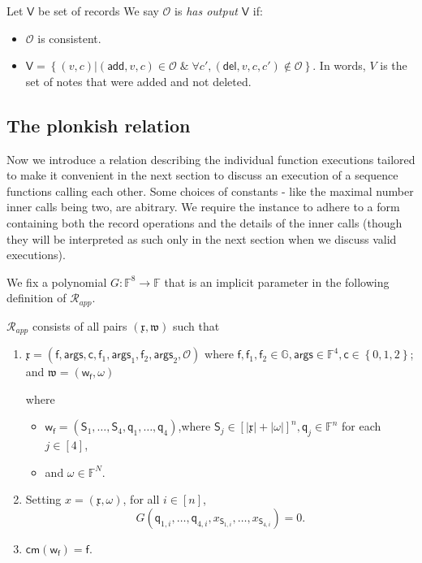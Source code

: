 \documentclass[11pt]{article} %
\newcommand{\G}{\ensuremath{{\mathbb G}}\xspace}
\newcommand{\F}{\ensuremath{\mathbb F}\xspace}
\newcommand{\cm}{\ensuremath{\mathsf{cm}}\xspace}
\newcommand{\wit}{\ensuremath{\omega}\xspace}
\newcommand{\rel}{\ensuremath{\mathcal{R}}\xspace}
\newcommand{\set}[1]{\ensuremath{\left\{#1\right\}}\xspace}
\newcommand{\perm}{\mathsf{S}}
\newcommand{\f}{\ensuremath{\mathsf{f}}\xspace}
\newcommand{\relapp}{\ensuremath{\rel_{app}}\xspace}
\newcommand{\add}{\ensuremath{\mathsf{add}}\xspace}
\newcommand{\del}{\ensuremath{\mathsf{del}}\xspace}
\newcommand{\ops}{\ensuremath{\mathcal{O}}\xspace}
\newcommand{\instapp}{\ensuremath{\mathfrak{x}}\xspace}
\newcommand{\witapp}{\ensuremath{\mathfrak{w}}\xspace}
\newcommand{\witf}{\ensuremath{\mathsf{w_f}}\xspace}
\newcommand{\sel}{\ensuremath{\mathsf{q}}\xspace}
\newcommand{\args}{\ensuremath{\mathsf{args}}\xspace}
\newcommand{\callnum}{\ensuremath{\mathsf{c}}\xspace}
\newcommand{\recset}{\ensuremath{\mathsf{V}}\xspace}
\begin{document}
Let \recset be set of records 
We say $\ops$ is \emph{has output \recset} if:
\begin{itemize}
 \item $\ops$ is consistent.
 \item $\recset=\set{(v,c) | (\add,v,c)\in \ops\;\&\; \forall c',(\del,v,c,c')\notin \ops }$. In words,
 $V$ is the set of notes that were added and not deleted.
\end{itemize}



\subsection{The plonkish relation}
Now we introduce a relation describing the individual function executions tailored to make it convenient in the next section to discuss an execution of a  sequence functions calling each other.
Some choices of constants - like the maximal number inner calls being two, are abitrary.
We require the instance to adhere to a form containing both the record operations and the details of the inner calls (though they will be interpreted as such only in the next section when we discuss valid executions).

We fix a polynomial $G:\F^8\to \F$ that is an implicit parameter in the following definition of \relapp.

\relapp consists of all pairs $(\instapp, \witapp)$ such that
\begin{enumerate}
 \item 

$\instapp= (\f,\args,\callnum, \f_1,\args_1, \f_2,\args_2,\ops)$
where $\f,\f_1,\f_2 \in \G,\args\in \F^4,\callnum\in \set{0,1,2}$; and
$\witapp=(\witf,\wit)$

where 
\begin{itemize}
 \item 


$\witf=(\perm_1,\ldots,\perm_4,\sel_1,\ldots,\sel_4)$,where $\perm_j \in [|\instapp|+|\wit|]^n,\sel_j \in \F^n$ for each $j\in [4]$,
\item and $\wit\in \F^N$.
\end{itemize}
                                                                                
\item  Setting $x=(\instapp,\wit)$, for all $i\in [n]$,
\[G(\sel_{1,i},\ldots,\sel_{4,i},x_{\perm_{1,i}},\ldots,x_{\perm_{4,i}})=0.\]
\item $\cm(\witf)=\f$.
\end{enumerate}
\end{document}
